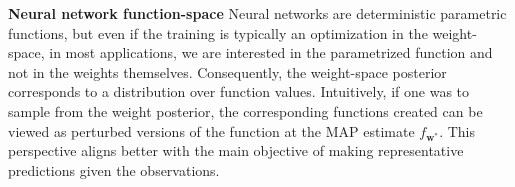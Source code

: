 \documentclass{article}
\newcommand{\mbf}[1]{\mathbf{#1}}
\newcommand{\vw}{\mbf{w}}
\begin{document}
\textbf{Neural network function-space} %
Neural networks are deterministic parametric functions, but even if the training is typically an optimization in the weight-space, in most applications, we are interested in the parametrized function and not in the weights themselves.
Consequently, the weight-space posterior corresponds to a distribution over function values. 
Intuitively, if one was to sample from the weight posterior, the corresponding functions created can be viewed as perturbed versions of the function at the MAP estimate $f_{\vw^*}$. This perspective aligns better with the main objective of making representative predictions given the observations.
\end{document}
